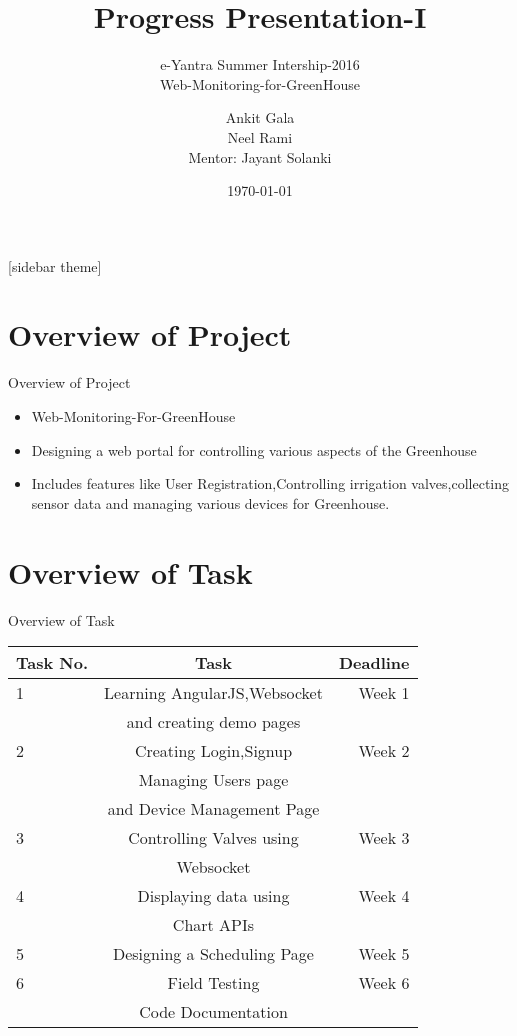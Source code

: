 \documentclass[10pt, a4paper]{beamer}
\begin{document}
	\title{Progress Presentation-I}
	\subtitle{e-Yantra Summer Intership-2016 \\ Web-Monitoring-for-GreenHouse}
	\author{Ankit Gala\\Neel Rami\\
	Mentor: Jayant Solanki}
	\date{\today}
	\frame{\titlepage}

[sidebar theme]
\section{Overview of Project}
\begin{frame}{Overview of Project}
	\begin{itemize}
		\item Web-Monitoring-For-GreenHouse
		\item Designing a web portal for controlling various aspects of the Greenhouse
		\item Includes features like User Registration,Controlling irrigation valves,collecting sensor data and managing various devices for Greenhouse.
	\end{itemize}
\end{frame}

\section{Overview of Task}
\begin{frame}{Overview of Task}
	\begin{tabular}{||l|c|r||}
	     \hline
	     Task No. & Task & Deadline \\
	     \hline
	     1 & Learning AngularJS,Websocket & Week 1 \\
	       & and creating demo pages & \\
	    \hline
	    2 & Creating Login,Signup & Week 2 \\ 
	        & Managing Users page & \\
            & and Device Management Page &\\
        \hline
        3 & Controlling Valves using & Week 3\\
         & Websocket & \\
         \hline
         
         4 & Displaying data using & Week 4 \\
          & Chart APIs & \\
          \hline
          5 & Designing a Scheduling Page & Week 5\\
          \hline
          6 & Field Testing & Week 6\\
          & Code Documentation & \\
          \hline
        \end{tabular}
\end{frame}
\end{document}
